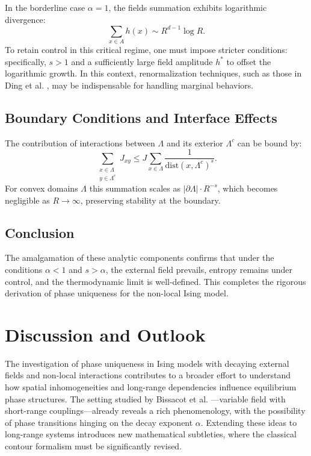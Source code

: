 \documentclass{article}
\begin{document}
In the borderline case $\alpha=1$, the fields summation exhibits logarithmic divergence:
\[
\sum_{x\in A} h(x) \sim R^{d-1} \log R.
\]
To retain control in this critical regime, one must impose stricter conditions: specifically, $s>1$ and a sufficiently large field amplitude $h^*$ to offset the logarithmic growth. In this context, renormalization techniques, such as those in Ding et al. \cite{ding2022}, may be indispensable for handling marginal behaviors.

\subsection{Boundary Conditions and Interface Effects}

The contribution of interactions between $\Lambda$ and its exterior $\Lambda^c$ can be bound by:
\[
\sum_{\substack{x\in\Lambda\\ y\in\Lambda^c}} J_{xy} \leq J \sum_{x\in\Lambda} \frac{1}{\text{dist}(x,\Lambda^c)^s}.
\]
For convex domains $\Lambda$ this summation scales as $|\partial\Lambda| \cdot R^{-s}$, which becomes negligible as $R\to\infty$, preserving stability at the boundary.

\subsection{Conclusion}

The amalgamation of these analytic components confirms that under the conditions $\alpha<1$ and $s>\alpha$, the external field prevails, entropy remains under control, and the thermodynamic limit is well-defined. This completes the rigorous derivation of phase uniqueness for the non-local Ising model.

\section{Discussion and Outlook}

The investigation of phase uniqueness in Ising models with decaying external fields and non-local interactions contributes to a broader effort to understand how spatial inhomogeneities and long-range dependencies influence equilibrium phase structures. The setting studied by Bissacot et al. \cite{bissacot2015}---variable field with short-range couplings---already reveals a rich phenomenology, with the possibility of phase transitions hinging on the decay exponent $\alpha$. Extending these ideas to long-range systems introduces new mathematical subtleties, where the classical contour formalism must be significantly revised.
\end{document}
